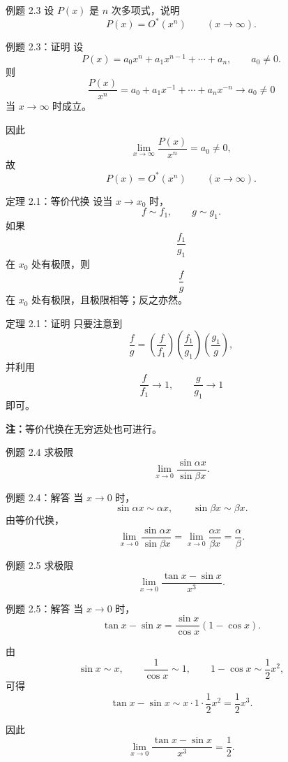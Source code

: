 ﻿\documentclass[aspectratio=169,11pt]{ctexbeamer}
\begin{document}
\begin{frame}{例题 2.3}
设 $P(x)$ 是 $n$ 次多项式，说明
\[
  P(x)=O^*(x^n)\qquad (x\to\infty).
\]
\end{frame}

\begin{frame}{例题 2.3：证明}
设
\[
  P(x)=a_0x^n+a_1x^{n-1}+\cdots+a_n,\qquad a_0\ne 0.
\]
则
\[
  \frac{P(x)}{x^n}=a_0+a_1x^{-1}+\cdots+a_nx^{-n}\to a_0\ne 0
\]
当 $x\to\infty$ 时成立。

因此
\[
  \lim_{x\to\infty}\frac{P(x)}{x^n}=a_0\ne 0,
\]
故
\[
  P(x)=O^*(x^n)\qquad (x\to\infty).
\]
\end{frame}

\begin{frame}{定理 2.1：等价代换}
设当 $x\to x_0$ 时，
\[
  f\sim f_1,\qquad g\sim g_1.
\]
如果
\[
  \frac{f_1}{g_1}
\]
在 $x_0$ 处有极限，则
\[
  \frac{f}{g}
\]
在 $x_0$ 处有极限，且极限相等；反之亦然。
\end{frame}

\begin{frame}{定理 2.1：证明}
只要注意到
\[
  \frac{f}{g}
  =
  \left(\frac{f}{f_1}\right)
  \left(\frac{f_1}{g_1}\right)
  \left(\frac{g_1}{g}\right),
\]
并利用
\[
  \frac{f}{f_1}\to 1,\qquad \frac{g}{g_1}\to 1
\]
即可。

\vspace{0.6em}
\textbf{注：}等价代换在无穷远处也可进行。
\end{frame}

\begin{frame}{例题 2.4}
求极限
\[
  \lim_{x\to 0}\frac{\sin \alpha x}{\sin \beta x}.
\]
\end{frame}

\begin{frame}{例题 2.4：解答}
当 $x\to 0$ 时，
\[
  \sin \alpha x\sim \alpha x,\qquad \sin \beta x\sim \beta x.
\]
由等价代换，
\[
  \lim_{x\to 0}\frac{\sin \alpha x}{\sin \beta x}
  =
  \lim_{x\to 0}\frac{\alpha x}{\beta x}
  =
  \frac{\alpha}{\beta}.
\]
\end{frame}

\begin{frame}{例题 2.5}
求极限
\[
  \lim_{x\to 0}\frac{\tan x-\sin x}{x^3}.
\]
\end{frame}

\begin{frame}{例题 2.5：解答}
当 $x\to 0$ 时，
\[
  \tan x-\sin x
  =
  \frac{\sin x}{\cos x}(1-\cos x).
\]

由
\[
  \sin x\sim x,\qquad \frac{1}{\cos x}\sim 1,\qquad 1-\cos x\sim \frac12x^2,
\]
可得
\[
  \tan x-\sin x\sim x\cdot 1\cdot \frac12x^2=\frac12x^3.
\]

因此
\[
  \lim_{x\to 0}\frac{\tan x-\sin x}{x^3}=\frac12.
\]
\end{frame}
\end{document}

